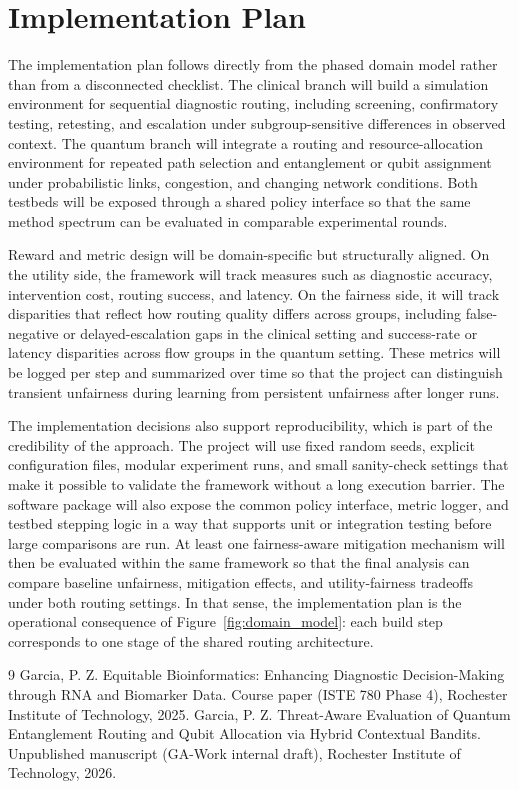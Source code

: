\documentclass{IEEEtran}
\begin{document}
\section{Implementation Plan}
The implementation plan follows directly from the phased domain model rather than from a disconnected checklist. The clinical branch will build a simulation environment for sequential diagnostic routing, including screening, confirmatory testing, retesting, and escalation under subgroup-sensitive differences in observed context. The quantum branch will integrate a routing and resource-allocation environment for repeated path selection and entanglement or qubit assignment under probabilistic links, congestion, and changing network conditions. Both testbeds will be exposed through a shared policy interface so that the same method spectrum can be evaluated in comparable experimental rounds.

Reward and metric design will be domain-specific but structurally aligned. On the utility side, the framework will track measures such as diagnostic accuracy, intervention cost, routing success, and latency. On the fairness side, it will track disparities that reflect how routing quality differs across groups, including false-negative or delayed-escalation gaps in the clinical setting and success-rate or latency disparities across flow groups in the quantum setting. These metrics will be logged per step and summarized over time so that the project can distinguish transient unfairness during learning from persistent unfairness after longer runs.

The implementation decisions also support reproducibility, which is part of the credibility of the approach. The project will use fixed random seeds, explicit configuration files, modular experiment runs, and small sanity-check settings that make it possible to validate the framework without a long execution barrier. The software package will also expose the common policy interface, metric logger, and testbed stepping logic in a way that supports unit or integration testing before large comparisons are run. At least one fairness-aware mitigation mechanism will then be evaluated within the same framework so that the final analysis can compare baseline unfairness, mitigation effects, and utility-fairness tradeoffs under both routing settings. In that sense, the implementation plan is the operational consequence of Figure~\ref{fig:domain_model}: each build step corresponds to one stage of the shared routing architecture.

\begin{thebibliography}{9}\setlength{\itemsep}{0em}
Garcia, P. Z. Equitable Bioinformatics: Enhancing Diagnostic Decision-Making through {RNA}
and Biomarker Data. Course paper (ISTE 780 Phase 4), Rochester Institute of Technology,
2025.
Garcia, P. Z. Threat-Aware Evaluation of Quantum Entanglement Routing and Qubit Allocation
via Hybrid Contextual Bandits. Unpublished manuscript (GA-Work internal draft), Rochester
Institute of Technology, 2026.
\end{thebibliography}
\end{document}
